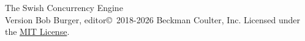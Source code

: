 \documentclass[letterpaper,11pt,twoside,final]{report}
\begin{document}
\begin{sagianbook}{The Swish Concurrency Engine\\
    Version }{Bob Burger,
    editor}{\copyright\ 2018-2026 Beckman Coulter, Inc.
    Licensed under the \href{https://opensource.org/licenses/MIT}{MIT License}.}



\end{sagianbook}
\end{document}
